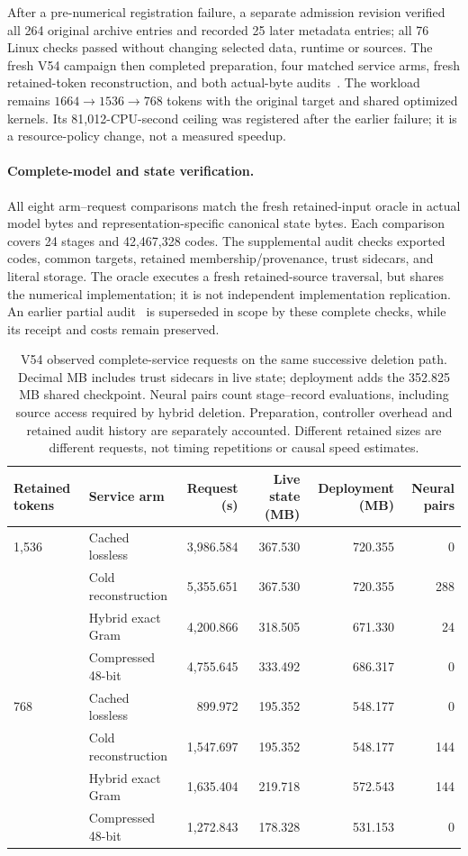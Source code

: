 \documentclass[10pt,twocolumn,letterpaper]{article}
\begin{document}
After a pre-numerical registration failure, a separate admission revision
verified all 264 original archive entries and recorded 25 later metadata entries;
all 76 Linux checks passed without changing selected data, runtime or sources. The fresh
V54 campaign then completed preparation, four matched service arms, fresh
retained-token reconstruction, and both actual-byte audits~\cite{v54,v58terminal}.
The workload remains $1664\to1536\to768$ tokens with the original target and
shared optimized kernels. Its 81,012-CPU-second ceiling was registered after
the earlier failure; it is a resource-policy change, not a measured speedup.

\paragraph{Complete-model and state verification.}
All eight arm--request comparisons match the fresh retained-input oracle in
actual model bytes and representation-specific canonical state bytes. Each
comparison covers 24 stages and 42,467,328 codes. The supplemental audit checks
exported codes, common targets, retained membership/provenance, trust sidecars,
and literal storage. The oracle executes a fresh retained-source traversal,
but shares the numerical implementation; it is not independent implementation
replication. An earlier partial audit~\cite{v57prefix} is superseded in scope
by these complete checks, while its receipt and costs remain preserved.

\begin{table}[t]
\centering
\small
\begin{tabular}{llrrrr}
\toprule
Retained tokens & Service arm & Request (s) & Live state (MB) & Deployment (MB) & Neural pairs \\
\midrule
1,536 & Cached lossless & 3,986.584 & 367.530 & 720.355 & 0 \\
      & Cold reconstruction & 5,355.651 & 367.530 & 720.355 & 288 \\
      & Hybrid exact Gram & 4,200.866 & 318.505 & 671.330 & 24 \\
      & Compressed 48-bit & 4,755.645 & 333.492 & 686.317 & 0 \\
\midrule
768 & Cached lossless & 899.972 & 195.352 & 548.177 & 0 \\
    & Cold reconstruction & 1,547.697 & 195.352 & 548.177 & 144 \\
    & Hybrid exact Gram & 1,635.404 & 219.718 & 572.543 & 144 \\
    & Compressed 48-bit & 1,272.843 & 178.328 & 531.153 & 0 \\
\bottomrule
\end{tabular}
\caption{V54 observed complete-service requests on the same successive deletion
path. Decimal MB includes trust sidecars in live state; deployment adds the
352.825 MB shared checkpoint. Neural pairs count stage--record evaluations,
including source access required by hybrid deletion. Preparation, controller
overhead and retained audit history are separately accounted. Different retained
sizes are different requests, not timing repetitions or causal speed estimates.}
\label{tab:v54}
\end{table}
\end{document}
